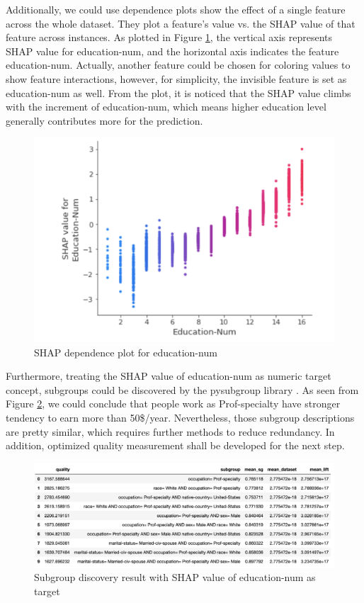 \documentclass[runningheads]{llncs}
\begin{document}
	Additionally, we could use dependence plots show the effect of a single feature across the whole dataset. They plot a feature’s value vs. the SHAP value of that feature across instances. As plotted in Figure \ref{fig:edu_dependence}, the vertical axis represents SHAP value for education-num, and the horizontal axis indicates the feature education-num. Actually, another feature could be chosen for coloring values to show feature interactions, however, for simplicity, the invisible feature is set as education-num as well. From the plot, it is noticed that the SHAP value climbs with the increment of education-num, which means higher education level generally contributes more for the prediction.
	
	\begin{figure}
		\centering
		\includegraphics[width=1.0\textwidth]{img/education_dependence_plot.png}
		\caption{SHAP dependence plot for education-num}
		\label{fig:edu_dependence}
	\end{figure}

	Furthermore, treating the SHAP value of education-num as numeric target concept, subgroups could be discovered by the pysubgroup library \cite{lemmerich2018pysubgroup}. As seen from Figure \ref{fig:edu_sg_discovery}, we could conclude that people work as Prof-specialty have stronger tendency to earn more than 50\$/year. Nevertheless, those subgroup descriptions are pretty similar, which requires further methods to reduce redundancy. In addition, optimized quality measurement shall be developed for the next step.
	
	\begin{figure}
		\centering
		\includegraphics[width=1.2\textwidth]{img/edu_sg_discovery.png}
		\caption{Subgroup discovery result with SHAP value of education-num as target}
		\label{fig:edu_sg_discovery}
	\end{figure}
\end{document}
